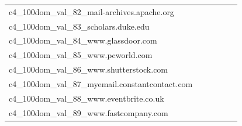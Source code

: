 \documentclass[dvipsnames]{article}
\begin{document}
\begin{appendix}
{\begin{longtable}{m{6cm}m{1.7cm}m{1.7cm}m{1.7cm}m{1.7cm}m{1.7cm}}
	c4\_100dom\_val\_82\_mail-archives.apache.org  & \colorbox[HTML]{f8fcc2}{\makebox[\mywidth][c]{5.67}} & \colorbox[HTML]{e8f6ae}{\makebox[\mywidth][c]{5.61}} & \colorbox[HTML]{ffffe5}{\makebox[\mywidth][c]{6.17}} & \colorbox[HTML]{cae99c}{\makebox[\mywidth][c]{5.56}} & \colorbox[HTML]{77c578}{\makebox[\mywidth][c]{5.49}}\\
	c4\_100dom\_val\_83\_scholars.duke.edu  & \colorbox[HTML]{fefee3}{\makebox[\mywidth][c]{8.72}} & \colorbox[HTML]{f8fcc2}{\makebox[\mywidth][c]{8.43}} & \colorbox[HTML]{ffffe5}{\makebox[\mywidth][c]{9.03}} & \colorbox[HTML]{daf0a4}{\makebox[\mywidth][c]{8.32}} & \colorbox[HTML]{77c578}{\makebox[\mywidth][c]{8.21}}\\
	c4\_100dom\_val\_84\_www.glassdoor.com  & \colorbox[HTML]{ffffe5}{\makebox[\mywidth][c]{16.64}} & \colorbox[HTML]{d4eea0}{\makebox[\mywidth][c]{15.97}} & \colorbox[HTML]{ffffe5}{\makebox[\mywidth][c]{16.99}} & \colorbox[HTML]{ddf1a6}{\makebox[\mywidth][c]{16.00}} & \colorbox[HTML]{77c578}{\makebox[\mywidth][c]{15.83}}\\
	c4\_100dom\_val\_85\_www.pcworld.com  & \colorbox[HTML]{fefee0}{\makebox[\mywidth][c]{12.34}} & \colorbox[HTML]{ebf7b0}{\makebox[\mywidth][c]{11.95}} & \colorbox[HTML]{ffffe5}{\makebox[\mywidth][c]{12.95}} & \colorbox[HTML]{dff2a7}{\makebox[\mywidth][c]{11.90}} & \colorbox[HTML]{77c578}{\makebox[\mywidth][c]{11.72}}\\
	c4\_100dom\_val\_86\_www.shutterstock.com  & \colorbox[HTML]{bbe395}{\makebox[\mywidth][c]{8.70}} & \colorbox[HTML]{e4f4ab}{\makebox[\mywidth][c]{8.89}} & \colorbox[HTML]{ffffe5}{\makebox[\mywidth][c]{10.75}} & \colorbox[HTML]{a2d889}{\makebox[\mywidth][c]{8.62}} & \colorbox[HTML]{77c578}{\makebox[\mywidth][c]{8.52}}\\
	c4\_100dom\_val\_87\_myemail.constantcontact.com  & \colorbox[HTML]{fdfedc}{\makebox[\mywidth][c]{14.59}} & \colorbox[HTML]{ebf7b0}{\makebox[\mywidth][c]{14.24}} & \colorbox[HTML]{ffffe5}{\makebox[\mywidth][c]{15.32}} & \colorbox[HTML]{dff2a7}{\makebox[\mywidth][c]{14.18}} & \colorbox[HTML]{77c578}{\makebox[\mywidth][c]{13.98}}\\
	c4\_100dom\_val\_88\_www.eventbrite.co.uk  & \colorbox[HTML]{fefee3}{\makebox[\mywidth][c]{14.47}} & \colorbox[HTML]{e7f5ad}{\makebox[\mywidth][c]{13.99}} & \colorbox[HTML]{ffffe5}{\makebox[\mywidth][c]{14.89}} & \colorbox[HTML]{e7f5ad}{\makebox[\mywidth][c]{13.98}} & \colorbox[HTML]{77c578}{\makebox[\mywidth][c]{13.79}}\\
	c4\_100dom\_val\_89\_www.fastcompany.com  & \colorbox[HTML]{fbfdd0}{\makebox[\mywidth][c]{14.24}} & \colorbox[HTML]{c8e89a}{\makebox[\mywidth][c]{13.75}} & \colorbox[HTML]{ffffe5}{\makebox[\mywidth][c]{15.52}} & \colorbox[HTML]{daf0a4}{\makebox[\mywidth][c]{13.82}} & \colorbox[HTML]{77c578}{\makebox[\mywidth][c]{13.56}}\\

\end{longtable}}
\end{appendix}
\end{document}
